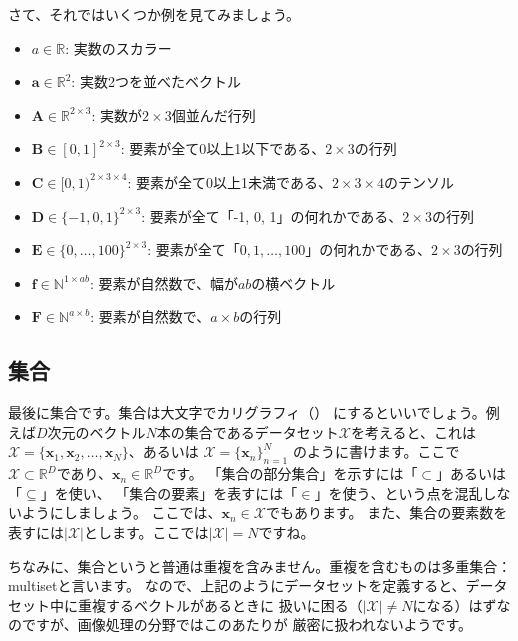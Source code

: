 \documentclass[uplatex,twocolumn,9pt,dvipdfmx]{jsarticle}
\begin{document}
さて、それではいくつか例を見てみましょう。
\begin{itemize}
    \item $a \in \mathbb{R}$: 実数のスカラー
    \item $\mathbf{a} \in \mathbb{R}^2$: 実数2つを並べたベクトル 
    \item $\mathbf{A} \in \mathbb{R}^{2 \times 3}$: 実数が$2\times3$個並んだ行列
    \item $\mathbf{B} \in [0, 1]^{2 \times 3}$: 要素が全て0以上1以下である、$2\times3$の行列    
    \item $\mathbf{C} \in [0, 1)^{2 \times 3 \times 4}$: 要素が全て0以上1未満である、$2\times 3 \times 4$のテンソル    
    \item $\mathbf{D} \in \{-1, 0, 1\}^{2 \times 3}$: 要素が全て「-1, 0, 1」の何れかである、$2\times3$の行列
    \item $\mathbf{E} \in \{0, \dots, 100\}^{2 \times 3}$: 要素が全て「$0, 1, \dots, 100$」の何れかである、$2\times3$の行列
    \item $\mathbf{f} \in \mathbb{N}^{1 \times ab}$: 要素が自然数で、幅が$ab$の横ベクトル
    \item $\mathbf{F} \in \mathbb{N}^{a \times b}$: 要素が自然数で、$a\times b$の行列
\end{itemize}

\subsection{集合}
最後に集合です。集合は大文字でカリグラフィ（\texttt{\mathcal}）
にするといいでしょう。例えば$D$次元のベクトル$N$本の集合であるデータセット$\mathcal{X}$を考えると、これは
$\mathcal{X} = \{ \mathbf{x}_1, \mathbf{x}_2, \dots, \mathbf{x}_N \}$、あるいは
$\mathcal{X} = \{ \mathbf{x}_n \}_{n=1}^N$ のように書けます。ここで
$\mathcal{X} \subset \mathbb{R}^D$であり、$\mathbf{x}_n \in \mathbb{R}^D$です。
「集合の部分集合」を示すには「$\subset$」あるいは「$\subseteq$」を使い、
「集合の要素」を表すには「$\in$」を使う、という点を混乱しないようにしましょう。
ここでは、$\mathbf{x}_n \in \mathcal{X}$でもあります。
また、集合の要素数を表すには$|\mathcal{X}|$とします。ここでは$|\mathcal{X}|=N$ですね。

ちなみに、集合というと普通は重複を含みません。重複を含むものは多重集合：multisetと言います。
なので、上記のようにデータセットを定義すると、データセット中に重複するベクトルがあるときに
扱いに困る（$|\mathcal{X}| \ne N$になる）はずなのですが、画像処理の分野ではこのあたりが
厳密に扱われないようです。
\end{document}
